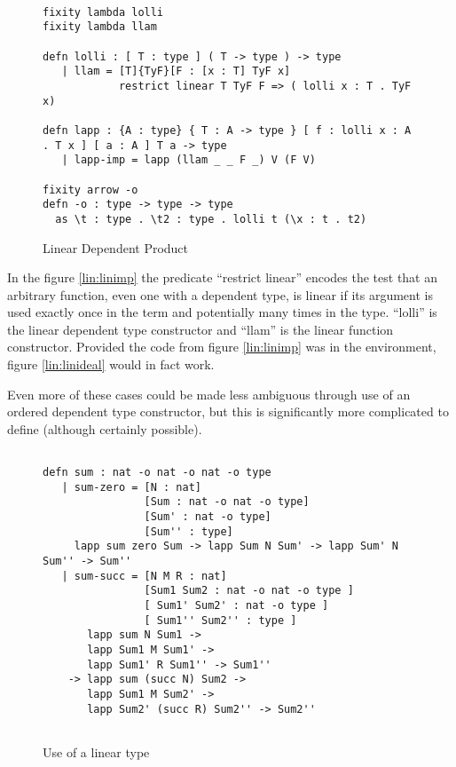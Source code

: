 \begin{figure}[H]
\begin{lstlisting}

fixity lambda lolli
fixity lambda llam

defn lolli : [ T : type ] ( T -> type ) -> type
   | llam = [T]{TyF}[F : [x : T] TyF x]
            restrict linear T TyF F => ( lolli x : T . TyF x)

defn lapp : {A : type} { T : A -> type } [ f : lolli x : A . T x ] [ a : A ] T a -> type
   | lapp-imp = lapp (llam _ _ F _) V (F V)

fixity arrow -o
defn -o : type -> type -> type
  as \t : type . \t2 : type . lolli t (\x : t . t2)

\end{lstlisting}
\caption{Linear Dependent Product}
\label{lin:lindep}
\end{figure}


In the figure \ref{lin:linimp} the predicate ``restrict linear'' encodes the test that an arbitrary function, even one with a dependent type, is linear \citep{benton1993term} if its argument is used
exactly once in the term and potentially many times in the type.  
``lolli'' is the linear dependent type constructor and ``llam'' is the linear function constructor.
Provided the code from figure \ref{lin:linimp} was in the environment, figure \ref{lin:linideal} would in fact work.


Even more of these cases could be made less ambiguous through use of an ordered dependent type 
constructor, but this is significantly more complicated to define (although certainly possible).


\begin{figure}[H]
\begin{lstlisting}

defn sum : nat -o nat -o nat -o type
   | sum-zero = [N : nat]
                [Sum : nat -o nat -o type]
                [Sum' : nat -o type]
                [Sum'' : type]
     lapp sum zero Sum -> lapp Sum N Sum' -> lapp Sum' N Sum'' -> Sum''
   | sum-succ = [N M R : nat]
                [Sum1 Sum2 : nat -o nat -o type ]
                [ Sum1' Sum2' : nat -o type ]
                [ Sum1'' Sum2'' : type ]
       lapp sum N Sum1 ->
       lapp Sum1 M Sum1' -> 
       lapp Sum1' R Sum1'' -> Sum1''
    -> lapp sum (succ N) Sum2 -> 
       lapp Sum1 M Sum2' ->
       lapp Sum2' (succ R) Sum2'' -> Sum2''
   
\end{lstlisting}
\caption{Use of a linear type}
\label{lin:use}
\end{figure}


